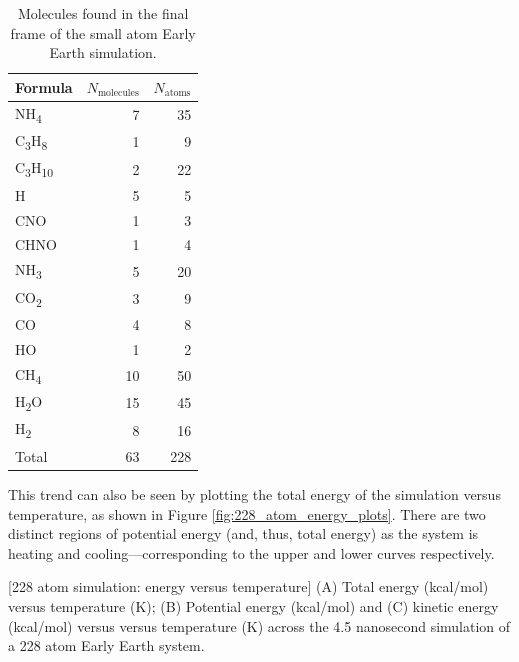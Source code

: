\begin{table}[h!]
\centering
\caption[Molecules in the final frame of the 228 atom run]{Molecules found in the final frame of the small atom Early Earth simulation.
}\label{tbl:228_final_sim_counts}
\begin{tabularx}{0.32\textwidth}{lrr}  
\toprule
Formula & $N_\text{molecules}$ & $N_\text{atoms}$ \\
\midrule
NH\textsubscript{4} & 7 & 35 \\
C\textsubscript{3}H\textsubscript{8} & 1 & 9 \\
C\textsubscript{3}H\textsubscript{10} & 2 & 22 \\
H & 5 & 5 \\
CNO & 1 & 3 \\
CHNO & 1 & 4 \\
NH\textsubscript{3} & 5 & 20 \\
CO\textsubscript{2} & 3 & 9 \\
CO & 4 & 8 \\
HO & 1 & 2 \\
CH\textsubscript{4} & 10 & 50  \\
H\textsubscript{2}O & 15 & 45 \\
H\textsubscript{2} & 8 & 16 \\
Total & 63 & 228 \\
\bottomrule
\end{tabularx}
\end{table}

This trend can also be seen by plotting the total energy of the simulation versus temperature, as shown in Figure \ref{fig:228_atom_energy_plots}.
There are two distinct regions of potential energy (and, thus, total energy) as the system is heating and cooling---corresponding to the upper and lower curves respectively.\\
\bigskip

\begin{multiFigure}
    \begin{minipage}{\linewidth}
        \centering
    \end{minipage}
[228 atom simulation: energy versus temperature]{
(A) Total energy (kcal/mol) versus temperature (K);
(B) Potential energy (kcal/mol) and (C) kinetic energy (kcal/mol) versus  versus temperature (K) across the 4.5 nanosecond simulation of a 228 atom Early Earth system.
}
\label{fig:228_atom_energy_plots}
\end{multiFigure}

